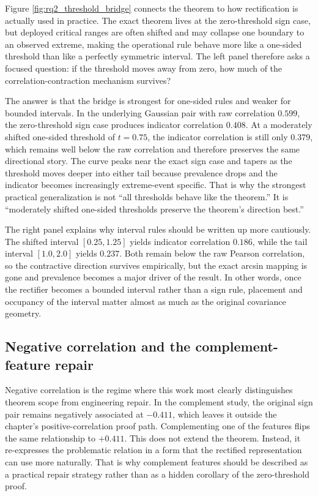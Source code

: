 Figure \ref{fig:rq2_threshold_bridge} connects the theorem to how rectification is actually used in practice. The exact theorem lives at the zero-threshold sign case, but deployed critical ranges are often shifted and may collapse one boundary to an observed extreme, making the operational rule behave more like a one-sided threshold than like a perfectly symmetric interval. The left panel therefore asks a focused question: if the threshold moves away from zero, how much of the correlation-contraction mechanism survives?

The answer is that the bridge is strongest for one-sided rules and weaker for bounded intervals. In the underlying Gaussian pair with raw correlation $0.599$, the zero-threshold sign case produces indicator correlation $0.408$. At a moderately shifted one-sided threshold of $t=0.75$, the indicator correlation is still only $0.379$, which remains well below the raw correlation and therefore preserves the same directional story. The curve peaks near the exact sign case and tapers as the threshold moves deeper into either tail because prevalence drops and the indicator becomes increasingly extreme-event specific. That is why the strongest practical generalization is not ``all thresholds behave like the theorem.'' It is ``moderately shifted one-sided thresholds preserve the theorem's direction best.''

The right panel explains why interval rules should be written up more cautiously. The shifted interval $[0.25,1.25]$ yields indicator correlation $0.186$, while the tail interval $[1.0,2.0]$ yields $0.237$. Both remain below the raw Pearson correlation, so the contractive direction survives empirically, but the exact arcsin mapping is gone and prevalence becomes a major driver of the result. In other words, once the rectifier becomes a bounded interval rather than a sign rule, placement and occupancy of the interval matter almost as much as the original covariance geometry.

\subsection{Negative correlation and the complement-feature repair}

Negative correlation is the regime where this work most clearly distinguishes theorem scope from engineering repair. In the complement study, the original sign pair remains negatively associated at $-0.411$, which leaves it outside the chapter's positive-correlation proof path. Complementing one of the features flips the same relationship to $+0.411$. This does not extend the theorem. Instead, it re-expresses the problematic relation in a form that the rectified representation can use more naturally. That is why complement features should be described as a practical repair strategy rather than as a hidden corollary of the zero-threshold proof.


